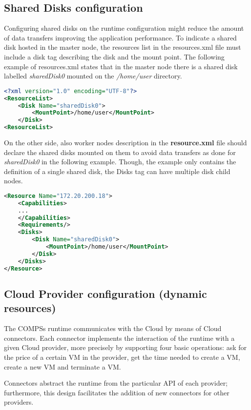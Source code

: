 \subsection{Shared Disks configuration}
Configuring shared disks on the runtime configuration might reduce the amount of data transfers improving 
the application performance. To indicate a shared disk hosted in the master node, the resources list in 
the resources.xml file must include a disk tag describing the disk and the mount point. The following 
example of resources.xml states that in the master node there is a shared disk labelled {\it sharedDisk0} 
mounted on the {\it /home/user} directory.

\begin{lstlisting}[language=xml]
<?xml version="1.0" encoding="UTF-8"?>
<ResourceList>
    <Disk Name="sharedDisk0">
        <MountPoint>/home/user</MountPoint>
    </Disk>
<ResourceList>
\end{lstlisting}

On the other side, also worker nodes description in the {\bf resource.xml} file should declare the shared 
disks mounted on them to avoid data transfers as done for {\it sharedDisk0} in the following example. 
Though, the example only contains the definition of a single shared disk, the Disks tag can have multiple 
disk child nodes.

\begin{lstlisting}[language=xml]
<Resource Name="172.20.200.18">
    <Capabilities>
    ...
    </Capabilities>
    <Requirements/>
    <Disks>
        <Disk Name="sharedDisk0">
            <MountPoint>/home/user</MountPoint>
        </Disk>
    </Disks>
</Resource>
\end{lstlisting}

\subsection{Cloud Provider configuration (dynamic resources)}

The COMPSs runtime communicates with the Cloud by means of Cloud connectors. Each connector implements 
the interaction of the runtime with a given Cloud provider, more precisely by supporting four basic 
operations: ask for the price of a certain VM in the provider, get the time needed to create a VM, 
create a new VM and terminate a VM.

Connectors abstract the runtime from the particular API of each provider; furthermore, this design 
facilitates the addition of new connectors for other providers.


